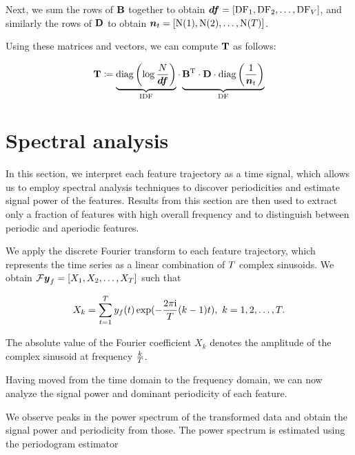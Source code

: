 Next, we sum the rows of $\mathbf{B}$ together to obtain $\vect{\df} = \left[ \text{\df}_{1}, \text{\df}_{2}, \dots, \text{\df}_{\featcount} \right]$, and similarly the rows of $\mathbf{D}$ to obtain $\vect{\doccount}_{t} = \left[ \text{\doccount}(1), \text{\doccount}(2), \dots, \text{\doccount}(\streamlen) \right]$.

Using these matrices and vectors, we can compute $\mathbf{T}$ as follows:

\begin{equation}
	\trajmat \coloneqq
		\underbrace{\text{diag} \left( \log{\frac{\doccount}{\vect{\df}}} \right)}_{\text{IDF}}
		\cdot
		\underbrace{\bowmat^{\T}
		\cdot \dtdmat
		\cdot \text{diag} \left( \frac{1}{\vect{\doccount}_{t}} \right)}_{\text{DF}}
\end{equation}


\section{Spectral analysis}
In this section, we interpret each feature trajectory as a time signal, which allows us to employ spectral analysis techniques to discover periodicities and estimate signal power of the features. Results from this section are then used to extract only a fraction of features with high overall frequency and to distinguish between periodic and aperiodic features.

We apply the discrete Fourier transform to each feature trajectory, which represents the time series as a linear combination of $T$ complex sinusoids. We obtain $\mathcal{F} \vect{\traj}_{f} = \left[ X_{1}, X_{2}, \dots, X_{\streamlen}\right ]$ such that

\begin{equation*}
	X_{k} = \sum_{t = 1}^{T}{y_{f}(t) \exp(- \frac{2 \pi \mathrm{i}}{T} (k - 1) t}), ~ k = 1, 2, \dots, T.
\end{equation*}

The absolute value of the Fourier coefficient $X_{k}$ denotes the amplitude of the complex sinusoid at frequency $\frac{k}{T}$.

Having moved from the time domain to the frequency domain, we can now analyze the signal power and dominant periodicity of each feature.

We observe peaks in the power spectrum of the transformed data and obtain the signal power and periodicity from those. The power spectrum is estimated using the periodogram estimator

